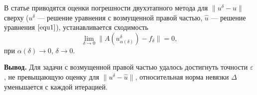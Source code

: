 В статье \cite{VasSkur2017} приводятся оценки погрешности двухэтапного метода для $\|u^{\delta}-\hat{u}\|$ сверху ($u^{\delta}$ --- решение уравнения с возмущенной правой частью, $\hat{u}$ --- решение уравнения $\eqref{equ1}$), устанавливается сходимость $$\lim_{\delta\to 0}\|A(u_{\alpha(\delta)}^{\delta})-f_\delta\|=0,$$ при $\alpha(\delta)\to 0$, $\delta\to 0$. 

{\bfseries\large Вывод.} Для задачи с возмущенной правой частью удалось достигнуть точности $\varepsilon$, не превыщающую оценку для $\|u^{\delta}-\hat{u}\|$, относительная норма невязки $\Delta$ уменьшается с каждой итерацией. 

